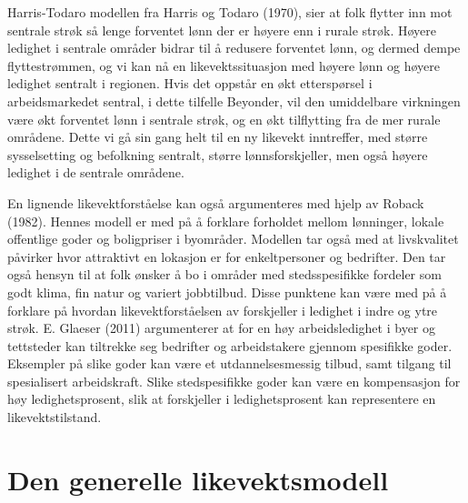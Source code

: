 \documentclass[
]{article}
\begin{document}
Harris-Todaro modellen fra Harris og Todaro (1970), sier at folk flytter
inn mot sentrale strøk så lenge forventet lønn der er høyere enn i
rurale strøk. Høyere ledighet i sentrale områder bidrar til å redusere
forventet lønn, og dermed dempe flyttestrømmen, og vi kan nå en
likevektssituasjon med høyere lønn og høyere ledighet sentralt i
regionen. Hvis det oppstår en økt etterspørsel i arbeidsmarkedet
sentral, i dette tilfelle Beyonder, vil den umiddelbare virkningen være
økt forventet lønn i sentrale strøk, og en økt tilflytting fra de mer
rurale områdene. Dette vi gå sin gang helt til en ny likevekt
inntreffer, med større sysselsetting og befolkning sentralt, større
lønnsforskjeller, men også høyere ledighet i de sentrale områdene.

En lignende likevektforståelse kan også argumenteres med hjelp av Roback
(1982). Hennes modell er med på å forklare forholdet mellom lønninger,
lokale offentlige goder og boligpriser i byområder. Modellen tar også
med at livskvalitet påvirker hvor attraktivt en lokasjon er for
enkeltpersoner og bedrifter. Den tar også hensyn til at folk ønsker å bo
i områder med stedsspesifikke fordeler som godt klima, fin natur og
variert jobbtilbud. Disse punktene kan være med på å forklare på hvordan
likevektforståelsen av forskjeller i ledighet i indre og ytre strøk. E.
Glaeser (2011) argumenterer at for en høy arbeidsledighet i byer og
tettsteder kan tiltrekke seg bedrifter og arbeidstakere gjennom
spesifikke goder. Eksempler på slike goder kan være et utdannelsesmessig
tilbud, samt tilgang til spesialisert arbeidskraft. Slike stedspesifikke
goder kan være en kompensasjon for høy ledighetsprosent, slik at
forskjeller i ledighetsprosent kan representere en likevektstilstand.

\newpage

\hypertarget{den-generelle-likevektsmodell}{%
\section{Den generelle
likevektsmodell}\label{den-generelle-likevektsmodell}}
\end{document}
